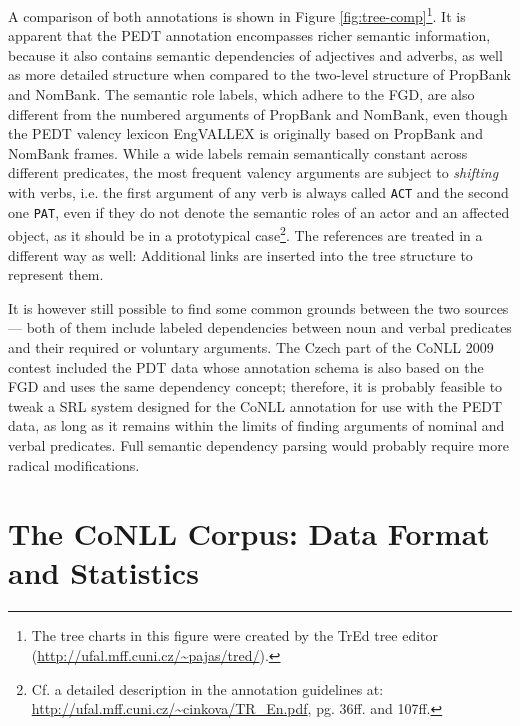 \documentclass[12pt,notitlepage]{report}
\begin{document}
A comparison of both annotations is shown in Figure \ref{fig:tree-comp}\footnote{The tree charts in this figure were created by the TrEd tree editor\\(\url{http://ufal.mff.cuni.cz/\~pajas/tred/}).}. It is apparent that the PEDT annotation encompasses richer semantic information, because it also contains semantic dependencies of adjectives and adverbs, as well as more detailed structure when compared to the two-level structure of PropBank and NomBank. The semantic role labels, which adhere to the FGD, are also different from the numbered arguments of PropBank and NomBank, even though the PEDT valency lexicon EngVALLEX \citep{semecky06} is originally based on PropBank and NomBank frames. While a wide labels remain semantically constant across different predicates, the most frequent valency arguments are subject to \emph{shifting} with verbs, i.e. the first argument of any verb is always called \texttt{ACT} and the second one \texttt{PAT}, even if they do not denote the semantic roles of an actor and an affected object, as it should be in a prototypical case\footnote{Cf. a detailed description in the annotation guidelines at: \\ \url{http://ufal.mff.cuni.cz/\~cinkova/TR\_En.pdf}, pg. 36ff. and 107ff.}. The references are treated in a different way as well: Additional links are inserted into the tree structure to represent them.

It is however still possible to find some common grounds between the two sources --- both of them include labeled dependencies between noun and verbal predicates and their required or voluntary arguments. The Czech part of the CoNLL 2009 contest included the PDT data whose annotation schema is also based on the FGD and uses the same dependency concept; therefore, it is probably feasible to tweak a SRL system designed for the CoNLL annotation for use with the PEDT data, as long as it remains within the limits of finding arguments of nominal and verbal predicates. Full semantic dependency parsing would probably require more radical modifications.

\section{The CoNLL Corpus: Data Format and Statistics}\label{data-format}
\end{document}

